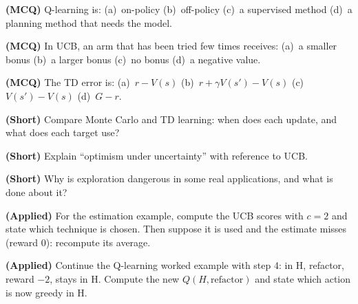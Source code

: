 \begin{reviewq}
  \item \textbf{(MCQ)} Q-learning is: (a)~on-policy (b)~off-policy (c)~a supervised
        method (d)~a planning method that needs the model.
  \item \textbf{(MCQ)} In UCB, an arm that has been tried few times receives:
        (a)~a smaller bonus (b)~a larger bonus (c)~no bonus (d)~a negative value.
  \item \textbf{(MCQ)} The TD error is: (a)~$r - V(s)$ (b)~$r + \gamma V(s') - V(s)$
        (c)~$V(s') - V(s)$ (d)~$G - r$.
  \item \textbf{(Short)} Compare Monte Carlo and TD learning: when does each update,
        and what does each target use?
  \item \textbf{(Short)} Explain ``optimism under uncertainty'' with reference to UCB.
  \item \textbf{(Short)} Why is exploration dangerous in some real applications, and
        what is done about it?
  \item \textbf{(Applied)} For the estimation example, compute the UCB scores with
        $c = 2$ and state which technique is chosen. Then suppose it is used and the
        estimate misses (reward 0): recompute its average.
  \item \textbf{(Applied)} Continue the Q-learning worked example with step 4: in H,
        refactor, reward $-2$, stays in H. Compute the new $Q(H, \text{refactor})$
        and state which action is now greedy in H.
\end{reviewq}
